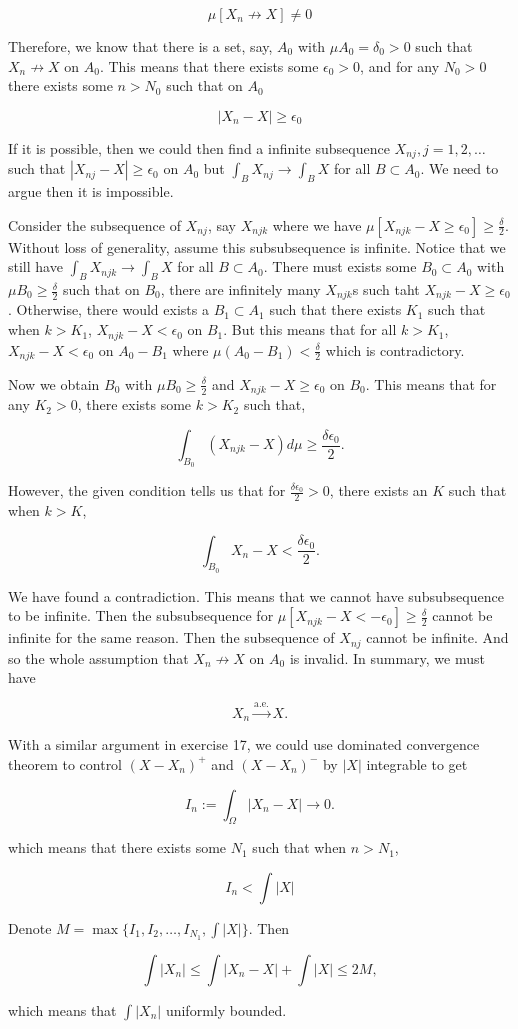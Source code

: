 \documentclass[
]{article}
\begin{document}
\[\mu[X_n \not\to X] \ne 0\]

Therefore, we know that there is a set, say, \(A_0\) with
\(\mu A_0 = \delta_0 > 0\) such that \(X_n \not\to X\) on \(A_0\). This
means that there exists some \(\epsilon_0 > 0\), and for any \(N_0 > 0\)
there exists some \(n > N_0\) such that on \(A_0\)

\[|X_n - X| \ge \epsilon_0\]

If it is possible, then we could then find a infinite subsequence
\(X_{nj}, j = 1, 2, \dots\) such that \(|X_{nj} - X| \ge \epsilon_0\) on
\(A_0\) but \(\int_{B} X_{nj} \to \int_{B} X\) for all
\(B \subset A_0\). We need to argue then it is impossible.

Consider the subsequence of \(X_{nj}\), say \(X_{njk}\) where we have
\(\mu[X_{njk} - X \ge \epsilon_0] \ge \frac{\delta}{2}\). Without loss
of generality, assume this subsubsequence is infinite. Notice that we
still have \(\int_{B} X_{njk} \to \int_B X\) for all \(B\subset A_0\).
There must exists some \(B_{0}\subset A_0\) with
\(\mu B_0 \ge \frac{\delta}{2}\) such that on \(B_0\), there are
infinitely many \(X_{njk}\)\textquotesingle s such taht
\(X_{njk} - X \ge \epsilon_0\). Otherwise, there would exists a
\(B_1 \subset A_1\) such that there exists \(K_1\) such that when
\(k > K_1\), \(X_{njk} - X < \epsilon_0\) on \(B_1\). But this means
that for all \(k > K_1\), \(X_{njk} - X < \epsilon_0\) on \(A_0 - B_1\)
where \(\mu(A_0 - B_1) < \frac{\delta}{2}\) which is contradictory.

Now we obtain \(B_0\) with \(\mu B_0 \ge \frac{\delta}{2}\) and
\(X_{njk} - X \ge \epsilon_0\) on \(B_0\). This means that for any
\(K_2 > 0\), there exists some \(k > K_2\) such that,

\[\int_{B_0} (X_{njk} - X) d\mu \ge \frac{\delta\epsilon_0}{2}.\]

However, the given condition tells us that for
\(\frac{\delta\epsilon_0}{2} > 0\), there exists an \(K\) such that when
\(k > K\),

\[\int_{B_0} X_n - X < \frac{\delta \epsilon_0}{2}.\]

We have found a contradiction. This means that we cannot have
subsubsequence to be infinite. Then the subsubsequence for
\(\mu[X_{njk} - X < -\epsilon_0] \ge \frac{\delta}{2}\) cannot be
infinite for the same reason. Then the subsequence of \(X_{nj}\) cannot
be infinite. And so the whole assumption that \(X_n \not\to X\) on
\(A_0\) is invalid. In summary, we must have

\[X_n \xrightarrow{\text{a.e.}} X.\]

With a similar argument in exercise 17, we could use dominated
convergence theorem to control \((X - X_n)^+\) and \((X - X_n)^-\) by
\(|X|\) integrable to get

\[I_n := \int_{\Omega} |X_n - X| \to 0.\]

which means that there exists some \(N_1\) such that when \(n > N_1\),

\[I_n < \int |X|\]

Denote \(M = \max\{I_1, I_2, \dots, I_{N_1}, \int |X|\}\). Then

\[\int |X_n| \le \int |X_n - X| + \int |X| \le 2M,\]

which means that \(\int |X_n|\) uniformly bounded.
\end{document}
